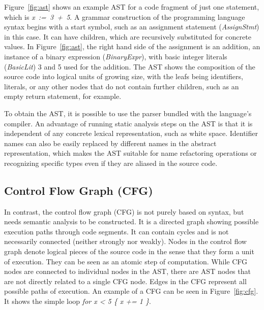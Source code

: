 

Figure~\ref{fig:ast} shows an example \acrshort{AST} for a code fragment of just one statement, which is
\textit{x~:=~3~+~5}.
A grammar construction of the programming language syntax begins with a start symbol, such as an assignment statement
(\textit{AssignStmt}) in this case.
It can have children, which are recursively substituted for concrete values.
In Figure~\ref{fig:ast}, the right hand side of the assignment is an addition, an instance of a binary expression
(\textit{BinaryExpr}), with basic integer literals (\textit{BasicLit}) 3 and 5 used for the addition.
The \acrshort{AST} shows the composition of the source code into logical units of growing size, with the leafs being
identifiers, literals, or any other nodes that do not contain further children, such as an empty return statement, for
example.

To obtain the \acrshort{AST}, it is possible to use the parser bundled with the language's compiler.
An advantage of running static analysis steps on the \acrshort{AST} is that it is independent of any concrete lexical
representation, such as white space.
Identifier names can also be easily replaced by different names in the abstract representation, which makes the
\acrshort{AST} suitable for name refactoring operations or recognizing specific types even if they are aliased in the
source code.



\subsection{Control Flow Graph (CFG)}\label{subsec:background:static-code-analysis:cfg}

In contrast, the control flow graph (\acrshort{CFG}) is not purely based on syntax, but needs semantic analysis to be
constructed.
It is a directed graph showing possible execution paths through code segments.
It can contain cycles and is not necessarily connected (neither strongly nor weakly).
Nodes in the control flow graph denote logical pieces of the source code in the sense that they form a unit of
execution.
They can be seen as an atomic step of computation.
While \acrshort{CFG} nodes are connected to individual nodes in the \acrshort{AST}, there are \acrshort{AST} nodes that
are not directly related to a single \acrshort{CFG} node.
Edges in the \acrshort{CFG} represent all possible paths of execution.
An example of a \acrshort{CFG} can be seen in Figure~\ref{fig:cfg}.
It shows the simple loop \textit{for x < 5 \{ x += 1 \}}.

